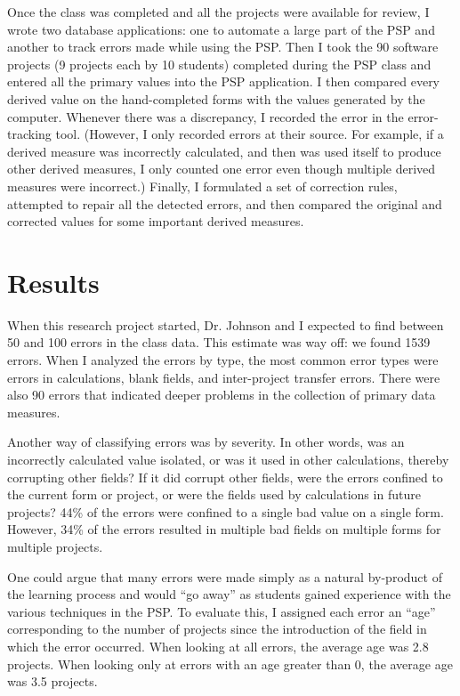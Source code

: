 Once the class was completed and all the projects were available for review,
I wrote two database applications: one to automate a large part of the PSP
and another to track errors made while using the PSP.  Then I took the 90
software projects (9 projects each by 10 students) completed during the PSP
class and entered all the primary values into the PSP application.  I then
compared every derived value on the hand-completed forms with the values
generated by the computer.  Whenever there was a discrepancy, I recorded
the error in the error-tracking tool.  (However, I only recorded errors at
their source.  For example, if a derived measure was incorrectly
calculated, and then was used itself to produce other derived measures, I
only counted one error even though multiple derived measures were
incorrect.)  Finally, I formulated a set of correction rules, attempted to
repair all the detected errors, and then compared the original and
corrected values for some important derived measures.

\section{Results}

When this research project started, Dr. Johnson and I expected to find
between 50 and 100 errors in the class data.  This estimate was way off: we
found 1539 errors.  When I analyzed the errors by type, the most common
error types were errors in calculations, blank fields, and inter-project
transfer errors.  There were also 90 errors that indicated deeper problems
in the collection of primary data measures.

Another way of classifying errors was by severity. In other words, was an
incorrectly calculated value isolated, or was it used in other
calculations, thereby corrupting other fields?  If it did corrupt other
fields, were the errors confined to the current form or project, or were
the fields used by calculations in future projects?  44\% of the errors were 
confined to a single bad value on a single form.  However, 34\% of the
errors resulted in multiple bad fields on multiple forms for multiple
projects.

One could argue that many errors were made simply as a natural by-product
of the learning process and would ``go away'' as students gained experience
with the various techniques in the PSP.  To evaluate this, I assigned each
error an ``age'' corresponding to the number of projects since the
introduction of the field in which the error occurred.  When looking at all
errors, the average age was 2.8 projects.  When looking only at errors with
an age greater than 0, the average age was 3.5 projects.

